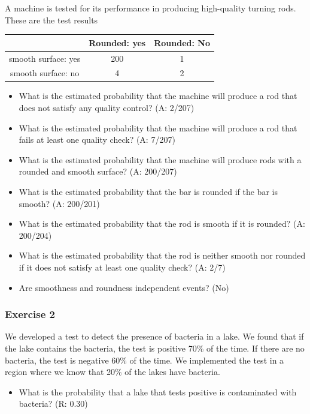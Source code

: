 \documentclass[
]{book}
\providecommand{\tightlist}{%
  \setlength{\itemsep}{0pt}\setlength{\parskip}{0pt}}
\begin{document}
A machine is tested for its performance in producing high-quality turning rods. These are the test results

\begin{longtable}[]{@{}ccc@{}}
\toprule\noalign{}
& Rounded: yes & Rounded: No \\
\midrule\noalign{}
\endhead
\bottomrule\noalign{}
\endlastfoot
smooth surface: yes & 200 & 1 \\
smooth surface: no & 4 & 2 \\
\end{longtable}

\begin{itemize}
\item
  What is the estimated probability that the machine will produce a rod that does not satisfy any quality control? (A: 2/207)
\item
  What is the estimated probability that the machine will produce a rod that fails at least one quality check? (A: 7/207)
\item
  What is the estimated probability that the machine will produce rods with a rounded and smooth surface? (A: 200/207)
\item
  What is the estimated probability that the bar is rounded if the bar is smooth? (A: 200/201)
\item
  What is the estimated probability that the rod is smooth if it is rounded? (A: 200/204)
\item
  What is the estimated probability that the rod is neither smooth nor rounded if it does not satisfy at least one quality check? (A: 2/7)
\item
  Are smoothness and roundness independent events? (No)
\end{itemize}

\hypertarget{exercise-2-1}{%
\subsubsection{Exercise 2}\label{exercise-2-1}}

We developed a test to detect the presence of bacteria in a lake. We found that if the lake contains the bacteria, the test is positive 70\% of the time. If there are no bacteria, the test is negative 60\% of the time. We implemented the test in a region where we know that 20\% of the lakes have bacteria.

\begin{itemize}
\tightlist
\item
  What is the probability that a lake that tests positive is contaminated with bacteria? (R: 0.30)
\end{itemize}
\end{document}
